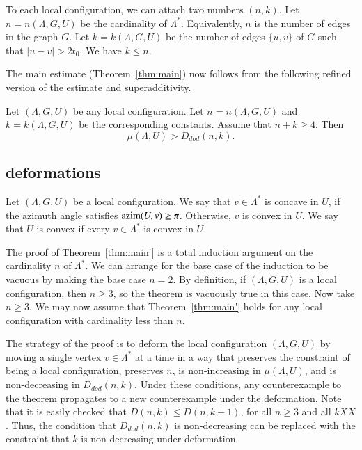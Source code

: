 
To each local configuration, we can attach two numbers $(n,k)$.
Let $n=n(\Lambda,G,U)$ be the cardinality of $\Lambda^*$.  Equivalently,
$n$ is the number of edges in the graph $G$.  Let
$k=k(\Lambda,G,U)$ be the number of edges $\{u,v\}$ of $G$ such
that $|u-v|> 2t_0$. We have $k\le n$.

The main estimate (Theorem~\ref{thm:main}) now follows from the following
refined version of the estimate and superadditivity.

\begin{theorem}\label{thm:main'}  
Let $(\Lambda,G,U)$ be any local configuration.
Let $n=n(\Lambda,G,U)$ and $k=k(\Lambda,G,U)$ be the corresponding constants.
Assume that $n+k\ge 4$.  Then
   $$
   \mu(\Lambda,U) > D_{dod}(n,k).
   $$
\end{theorem}

\subsection{deformations}

Let $(\Lambda,G,U)$ be a local configuration.  We say that $v\in\Lambda^*$
is concave in $U$, if the azimuth angle satisfies
${\operatorname{azim}}(U,v)\ge\pi$.  Otherwise,
$v$ is convex in $U$.  
We say that $U$ is convex if every $v\in\Lambda^*$ is convex in
$U$.

The proof of Theorem~\ref{thm:main'} is a total induction argument
on  the cardinality $n$ of $\Lambda^*$.  We can arrange for
the base case of the induction to be vacuous by making the
base case $n=2$. By definition, if $(\Lambda,G,U)$
is a local configuration, then $n\ge 3$, so the theorem is
vacuously true in this case.  Now take $n\ge 3$. We may now assume that
Theorem~\ref{thm:main'} holds for any local configuration with
cardinality less than $n$.  

The strategy of the proof is to deform the local configuration $(\Lambda,G,U)$ by moving a single vertex $v\in\Lambda^*$ at a time in a way
that preserves the constraint of being a local configuration,
preserves $n$, 
is non-increasing in $\mu(\Lambda,U)$, 
and is non-decreasing in $D_{dod}(n,k)$.
Under these conditions, any counterexample to the theorem propagates 
to a new counterexample under the deformation.
Note that it is easily checked that $D(n,k) \le D(n,k+1)$, for all
$n\ge 3$ and all $k XX$.  Thus, the condition that $D_{dod}(n,k)$
is non-decreasing can be replaced with the constraint that $k$
is non-decreasing under deformation.

